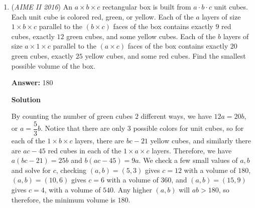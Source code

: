 \begin{enumerate}
Find the value of $|\log_5 x|+|\log_5 y|+|\log_5 z|$.


 
 \textbf{Answer: }265



\textbf{Solution}

First, we get rid of logs by taking powers: $xyz-3+\log_5 x=2^{5}=32$, $xyz-3+\log_5 y=3^{4}=81$, and $(xyz-3+\log_5 z)=4^{4}=256$. Adding all the equations up and using the $\log {xy}=\log {x}+\log{y}$ property, we have $3xyz+\log_5{xyz} = 378$, so we have $xyz=125$. Solving for $x,y,z$ by substituting $125$ for $xyz$ in each equation, we get $\log_5 x=-90, \log_5 y=-41, \log_5 z=134$, so adding all the absolute values we have $90+41+134=\boxed{265}$.

 Note: $xyz=125$ because we know $xyz$ has to be a power of $5$, and so it is not hard to test values in the equation $3xyz+\log_5{xyz} = 378$ in order to achieve desired value for $xyz$.

 


	\item (\textit{AIME II 2016}) An $a \times b \times c$ rectangular box is built from $a \cdot b \cdot c$ unit cubes. Each unit cube is colored red, green, or yellow. Each of the $a$ layers of size $1 \times b \times c$ parallel to the $(b \times c)$ faces of the box contains exactly $9$ red cubes, exactly $12$ green cubes, and some yellow cubes. Each of the $b$ layers of size $a \times 1 \times c$ parallel to the $(a \times c)$ faces of the box contains exactly $20$ green cubes, exactly $25$ yellow cubes, and some red cubes. Find the smallest possible volume of the box.


 
 \textbf{Answer: }180



\textbf{Solution}

By counting the number of green cubes $2$ different ways, we have $12a=20b$, or $a=\dfrac{5}{3} b$. Notice that there are only $3$ possible colors for unit cubes, so for each of the $1 \times b \times c$ layers, there are $bc-21$ yellow cubes, and similarly there are $ac-45$ red cubes in each of the $1 \times a \times c$ layers. Therefore, we have $a(bc-21)=25b$ and $b(ac-45)=9a$. We check a few small values of $a,b$ and solve for $c$, checking $(a,b)=(5,3)$ gives $c=12$ with a volume of $180$, $(a,b)=(10,6)$ gives $c=6$ with a volume of $360$, and $(a,b)=(15,9)$ gives $c=4$, with a volume of $540$. Any higher $(a,b)$ will $ab>180$, so therefore, the minimum volume is $\boxed{180}$.


\end{enumerate}
